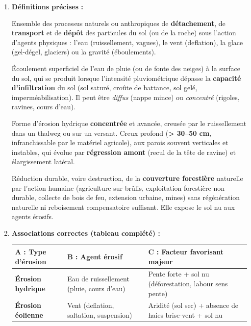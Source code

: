 \documentclass[11pt]{article}
\begin{document}
\begin{corrige}
\begin{enumerate}
    \item \textbf{Définitions précises :}
    \begin{definition}[Érosion]
    Ensemble des processus naturels ou anthropiques de \textbf{détachement}, de \textbf{transport} et de \textbf{dépôt} des particules du sol (ou de la roche) sous l'action d'agents physiques : l'eau (ruissellement, vagues), le vent (deflation), la glace (gel-dégel, glaciers) ou la gravité (éboulements).
    \end{definition}
    \begin{definition}[Ruissellement]
    Écoulement superficiel de l'eau de pluie (ou de fonte des neiges) à la surface du sol, qui se produit lorsque l'intensité pluviométrique dépasse la \textbf{capacité d'infiltration} du sol (sol saturé, croûte de battance, sol gelé, imperméabilisation). Il peut être \emph{diffus} (nappe mince) ou \emph{concentré} (rigoles, ravines, cours d'eau).
    \end{definition}
    \begin{definition}[Ravine]
    Forme d'érosion hydrique \textbf{concentrée} et avancée, creusée par le ruissellement dans un thalweg ou sur un versant. Creux profond (\textbf{> 30--50 cm}, infranchissable par le matériel agricole), aux parois souvent verticales et instables, qui évolue par \textbf{régression amont} (recul de la tête de ravine) et élargissement latéral.
    \end{definition}
    \begin{definition}[Déforestation]
    Réduction durable, voire destruction, de la \textbf{couverture forestière} naturelle par l'action humaine (agriculture sur brûlis, exploitation forestière non durable, collecte de bois de feu, extension urbaine, mines) sans régénération naturelle ni reboisement compensatoire suffisant. Elle expose le sol nu aux agents érosifs.
    \end{definition}

    \item \textbf{Associations correctes (tableau complété) :}
    \begin{center}
    \begin{tabularx}{\linewidth}{|>{\bfseries}X|X|X|}\hline
    \textbf{A : Type d'érosion} & \textbf{B : Agent érosif} & \textbf{C : Facteur favorisant majeur} \\ \hline
    Érosion hydrique & Eau de ruissellement (pluie, cours d'eau) & Pente forte + sol nu (déforestation, labour sens pente) \\ \hline
    Érosion éolienne & Vent (deflation, saltation, suspension) & Aridité (sol sec) + absence de haies brise-vent + sol nu \\ \hline
    \end{tabularx}
    \end{center}
\end{enumerate}
\end{corrige}
\end{document}
